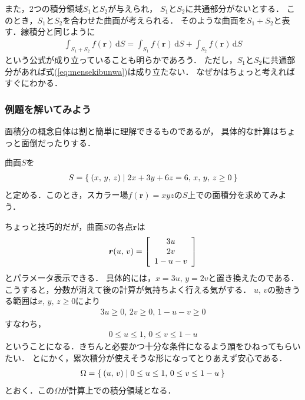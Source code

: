 また，2つの積分領域$S_1$と$S_2$が与えられ，
$S_1$と$S_2$に共通部分がないとする．
このとき，$S_1$と$S_2$を合わせた曲面が考えられる．
そのような曲面を$S_1 + S_2$と表す．線積分と同じように
\begin{align}
\int_{S_1 + S_2 } f(\bm{r} ) \, \mathrm{d}S = 
\int_{S_1} f(\bm{r} ) \, \mathrm{d}S + \int_{S_2} f(\bm{r} ) \, \mathrm{d}S  
\label{eq:mensekibunwa}
\end{align}
という公式が成り立っていることも明らかであろう．
ただし，$S_1$と$S_2$に共通部分があれば式(\ref{eq:mensekibunwa})は成り立たない．
なぜかはちょっと考えればすぐにわかる．

\subsubsection{例題を解いてみよう}
面積分の概念自体は割と簡単に理解できるものであるが，
具体的な計算はちょっと面倒だったりする．

曲面$S$を
\begin{align*} 
S = \Set{ (x, \, y, \, z) | 2x + 3y + 6z = 6 , \, x, \, y, \, z \geq 0 } 
\end{align*}
と定める．このとき，スカラー場$f(\bm{r}) = xyz$の$S$上での面積分を求めてみよう．

ちょっと技巧的だが，曲面$S$の各点$\bm{r}$は
\begin{align*}
\renewcommand{\arraystretch}{1}
\bm{r} (u, \, v) = \left[
\begin{array}{c}
3u \\
2v \\
1 - u - v 
\end{array}
\right]
\end{align*}
とパラメータ表示できる．
具体的には，$x=3u , \, y=2v$と置き換えたのである．
こうすると，分数が消えて後の計算が気持ちよく行える気がする．
$u, \, v$の動きうる範囲は$x, \, y, \, z \geq 0$により
\begin{align*}
3u \geq 0 , \, 
2v \geq 0 , \, 
1 - u - v \geq 0 
\end{align*}
すなわち，
\begin{align*}
0 \leq u \leq 1 , \, 0 \leq v \leq 1-u
\end{align*} 
ということになる．きちんと必要かつ十分な条件になるよう頭をひねってもらいたい．
とにかく，累次積分が使えそうな形になってとりあえず安心である．
\begin{align*}
\Omega = \Set{ (u, \, v) | 0 \leq u \leq 1 , \, 0 \leq v \leq 1-u}
\end{align*}
とおく．この$\Omega$が計算上での積分領域となる．

